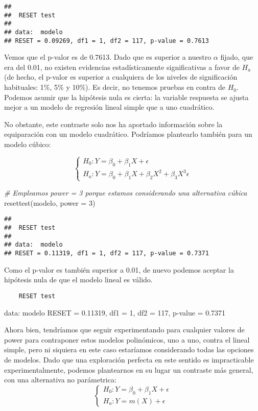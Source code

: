 \documentclass[
]{article}
\newenvironment{Shaded}{\begin{snugshade}}{\end{snugshade}}
\newcommand{\AttributeTok}[1]{\textcolor[rgb]{0.77,0.63,0.00}{#1}}
\newcommand{\CommentTok}[1]{\textcolor[rgb]{0.56,0.35,0.01}{\textit{#1}}}
\newcommand{\DecValTok}[1]{\textcolor[rgb]{0.00,0.00,0.81}{#1}}
\newcommand{\FunctionTok}[1]{\textcolor[rgb]{0.00,0.00,0.00}{#1}}
\newcommand{\NormalTok}[1]{#1}
\begin{document}
\begin{verbatim}
## 
##  RESET test
## 
## data:  modelo
## RESET = 0.09269, df1 = 1, df2 = 117, p-value = 0.7613
\end{verbatim}

Vemos que el p-valor es de 0.7613. Dado que es superior a nuestro
\(\alpha\) fijado, que era del 0.01, no existen evidencias
estadísticamente significativas a favor de \(H_a\) (de hecho, el p-valor
es superior a cualquiera de los niveles de significación habituales:
1\%, 5\% y 10\%). Es decir, no tenemos pruebas en contra de \(H_0\).
Podemos asumir que la hipótesis nula es cierta: la variable respuesta se
ajusta mejor a un modelo de regresión lineal simple que a uno
cuadrático.

No obstante, este contraste solo nos ha aportado información sobre la
equiparación con un modelo cuadrático. Podríamos plantearlo también para
un modelo cúbico:

\[
\begin{cases}
H_0: Y=\beta_0+\beta_1X+\epsilon\\
H_a: Y=\beta_0+\beta_1X+\beta_2X^2+\beta_3X^3\epsilon
\end{cases}
\]

\begin{Shaded}
\begin{Highlighting}[]
\CommentTok{\# Empleamos power = 3 porque estamos considerando una alternativa cúbica}
\FunctionTok{resettest}\NormalTok{(modelo, }\AttributeTok{power =} \DecValTok{3}\NormalTok{)}
\end{Highlighting}
\end{Shaded}

\begin{verbatim}
## 
##  RESET test
## 
## data:  modelo
## RESET = 0.11319, df1 = 1, df2 = 117, p-value = 0.7371
\end{verbatim}

Como el p-valor es también superior a 0.01, de nuevo podemos aceptar la
hipótesis nula de que el modelo lineal es válido.

\begin{verbatim}
    RESET test
\end{verbatim}

data: modelo RESET = 0.11319, df1 = 1, df2 = 117, p-value = 0.7371

Ahora bien, tendríamos que seguir experimentando para cualquier valores
de power para contraponer estos modelos polinómicos, uno a uno, contra
el lineal simple, pero ni siquiera en este caso estaríamos considerando
todas las opciones de modelos. Dado que una exploración perfecta en este
sentido es impracticable experimentalmente, podemos plantearnos en su
lugar un contraste más general, con una alternativa no parámetrica: \[
\begin{cases}
H_0: Y=\beta_0+\beta_1X+\epsilon\\
H_a: Y=m(X)+\epsilon
\end{cases}
\]
\end{document}

